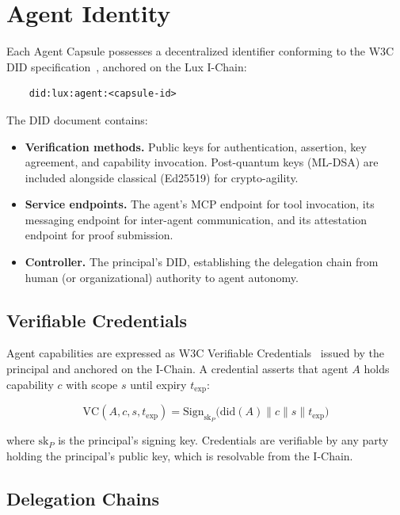 \section{Agent Identity}
\label{sec:identity}

Each Agent Capsule possesses a decentralized identifier conforming to the W3C DID specification~\cite{w3c-did2022}, anchored on the Lux I-Chain:

\begin{verbatim}
    did:lux:agent:<capsule-id>
\end{verbatim}

The DID document contains:

\begin{itemize}
    \item \textbf{Verification methods.} Public keys for authentication, assertion, key agreement, and capability invocation. Post-quantum keys (ML-DSA) are included alongside classical (Ed25519) for crypto-agility.
    \item \textbf{Service endpoints.} The agent's MCP endpoint for tool invocation, its messaging endpoint for inter-agent communication, and its attestation endpoint for proof submission.
    \item \textbf{Controller.} The principal's DID, establishing the delegation chain from human (or organizational) authority to agent autonomy.
\end{itemize}

\subsection{Verifiable Credentials}

Agent capabilities are expressed as W3C Verifiable Credentials~\cite{w3c-vc2022} issued by the principal and anchored on the I-Chain. A credential asserts that agent $A$ holds capability $c$ with scope $s$ until expiry $t_{\text{exp}}$:

\begin{equation}\label{eq:vc}
    \text{VC}(A, c, s, t_{\text{exp}}) = \text{Sign}_{\text{sk}_P}\big(\text{did}(A) \| c \| s \| t_{\text{exp}}\big)
\end{equation}

where $\text{sk}_P$ is the principal's signing key. Credentials are verifiable by any party holding the principal's public key, which is resolvable from the I-Chain.

\subsection{Delegation Chains}

